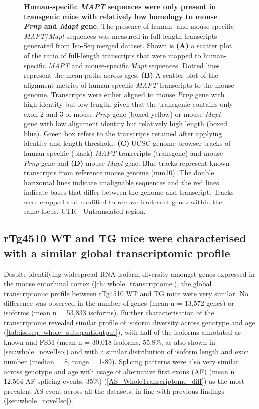 \begin{figure}[htp]
	{\textbf{Human-specific \textit{MAPT} sequences were only present in transgenic mice with relatively low homology to mouse \textit{Prnp} and \textit{Mapt} gene.} The presence of human- and mouse-specific \textit{MAPT}/\textit{Mapt} sequences was measured in full-length transcripts generated from Iso-Seq merged dataset. Shown is \textbf{(A)} a scatter plot of the ratio of full-length transcripts that were mapped to human-specific \textit{MAPT} and mouse-specific \textit{Mapt} sequences. Dotted lines represent the mean paths across ages. \textbf{(B)} A scatter plot of the alignment metrics of human-specific \textit{MAPT} transcripts to the mouse genome. Transcripts were either aligned to mouse \textit{Prnp} gene with high identity but low length, given that the transgenic contains only exon 2 and 3 of mouse \textit{Prnp} gene\cite{Ramsden2005} (boxed yellow) or mouse \textit{Mapt} gene with low alignment identity but relatively high length (boxed blue). Green box refers to the transcripts retained after applying identity and length threshold. \textbf{(C)} UCSC genome browser tracks of human-specific (black) \textit{MAPT} transcripts (transgene) and mouse \textit{Prnp} gene and \textbf{(D)} mouse \textit{Mapt} gene. Blue tracks represent known transcripts from reference mouse genome (mm10). The double horizontal lines indicate unalignable sequences and the red lines indicate bases that differ between the genome and transcript. Tracks were cropped and modified to remove irrelevant genes within the same locus. UTR - Untranslated region.}
	\label{fig:isoseq_humanmapt}
\end{figure}

\clearpage
\subsection{rTg4510 WT and TG mice were characterised with a similar global transcriptomic profile}
Despite identifying widespread RNA isoform diversity amongst genes expressed in the mouse entorhinal cortex (\cref{ch: whole_transcriptome}), the global transcriptomic profile between rTg4510 WT and TG mice were very similar. No difference was observed in the number of genes (mean n = 13,572 genes) or isoforms (mean n = 53,833 isoforms). Further characterisation of the transcriptome revealed similar profile of isoform diversity across genotype and age (\cref{tab:isoseq_whole_subsqantioutput}), with half of the isoforms annotated as known and FSM (mean n = 30,018 isoforms, 55.8\%, as also shown in \cref{sec:whole_novelIso}) and with a similar distribution of isoform length and exon number (median = 8, range = 1-89). Splicing patterns were also very similar across genotype and age with usage of alternative first exons (AF) (mean n = 12,564 AF splicing events, 35\%) (\cref{AS_WholeTranscriptome_diff}) as the most prevalent AS event across all the datasets, in line with previous findings (\cref{sec:whole_novelIso}).

